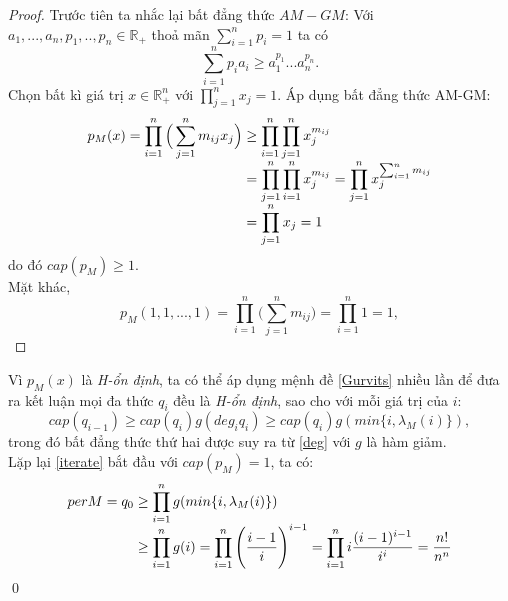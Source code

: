 \documentclass[a4paper, 12pt]{report}
\begin{document}
\begin{proof}
	Trước tiên ta nhắc lại bất đẳng thức $AM-GM$: Với $a_1,...,a_n, p_1,..,p_n \in \mathbb{R}_{+}$ thoả mãn $\sum_{i=1}^{n}p_{i} =1$ ta có
	\begin{equation*}
	\displaystyle \sum_{i=1}^{n} p_{i}a_{i} \geq a_{1}^{p_1}...a_{n}^{p_n}.
\end{equation*}
Chọn bất kì giá trị $x \in \mathbb{R}_{+}^{n}$ với $\prod_{j=1}^{n}x_{j} =1$. Áp dụng bất đẳng thức AM-GM:
\begin{equation*}
\begin{array}{l@{}l}
	p_M(x) = \displaystyle \prod_{i=1}^{n} \Big( \displaystyle \sum_{j=1}^{n} m_{ij}x_{j} \Big) &{}\geq \displaystyle \prod_{i=1}^{n} \displaystyle\prod_{j=1}^{n} x_{j}^{m_{ij}} \\
	&{}= \displaystyle\prod_{j=1}^{n}\displaystyle \prod_{i=1}^{n}x_{j}^{m_{ij}} = \displaystyle\prod_{j=1}^{n} x_j^{\sum_{i=1}^{n} m_{ij}} \\
	&{}= \displaystyle\prod_{j=1}^{n} x_j =1
\end{array}
\end{equation*}
do đó $cap(p_M) \geq 1$. \\
Mặt khác,
\begin{equation}
	p_M(1,1,...,1) = \displaystyle \prod_{i=1}^{n} \Big (\displaystyle \sum_{j=1}^{n} m_{ij} \Big) = \displaystyle\prod_{i=1}^{n} 1 =1,
\end{equation}
\end{proof} 
Vì $p_M(x)$ là \textit{H-ổn định}, ta có thể áp dụng mệnh đề \eqref{Gurvits} nhiều lần để đưa ra kết luận mọi đa thức $q_i$ đều là \textit{H-ổn định}, sao cho với mỗi giá trị của $i$:
\begin{equation}
	cap(q_{i-1}) \geq cap(q_i)g(deg_{i}q_i) \geq cap(q_i)g(min \{i, \lambda_{M}(i)\}), \label{iterate}
\end{equation}
trong đó bất đẳng thức thứ hai được suy ra từ \eqref{deg} với $g$ là hàm giảm.\\ 
Lặp lại  \eqref{iterate}   bắt đầu với $cap(p_M) =1$, ta có:
\begin{equation*}
\begin{array}{l@{}l}
	per M 
	= q_0 &{}\geq \displaystyle \prod_{i=1}^{n} g(min \{i,\lambda_M(i) \} )\\
	&{}\geq \displaystyle \prod_{i=1}^{n}g(i) = \displaystyle \prod_{i=1}^{n} \Bigg( \frac{i-1}{i} \Bigg)^{i-1} = \displaystyle \prod_{i=1}^{n}i\frac{(i-1)^{i-1}}{i^i} = \frac{n!}{n^n}
\end{array}
\end{equation*} \qed
\end{document}
